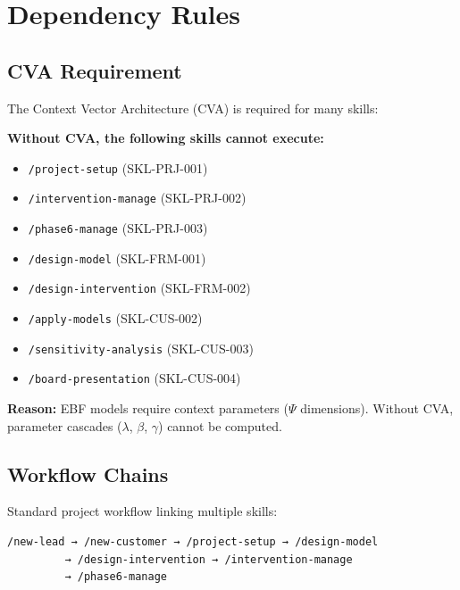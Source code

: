 
\section{Dependency Rules}
\label{sec:sk-dependencies}

\subsection{CVA Requirement}

The Context Vector Architecture (CVA) is required for many skills:

\begin{tcolorbox}[colback=red!5!white, colframe=red!75!black,
    title=CVA Required Skills]

\textbf{Without CVA, the following skills cannot execute:}
\begin{itemize}[nosep]
\item \texttt{/project-setup} (SKL-PRJ-001)
\item \texttt{/intervention-manage} (SKL-PRJ-002)
\item \texttt{/phase6-manage} (SKL-PRJ-003)
\item \texttt{/design-model} (SKL-FRM-001)
\item \texttt{/design-intervention} (SKL-FRM-002)
\item \texttt{/apply-models} (SKL-CUS-002)
\item \texttt{/sensitivity-analysis} (SKL-CUS-003)
\item \texttt{/board-presentation} (SKL-CUS-004)
\end{itemize}

\textbf{Reason:} EBF models require context parameters ($\Psi$ dimensions).
Without CVA, parameter cascades ($\lambda$, $\beta$, $\gamma$) cannot be computed.

\end{tcolorbox}

\subsection{Workflow Chains}

Standard project workflow linking multiple skills:

\begin{verbatim}
/new-lead → /new-customer → /project-setup → /design-model
         → /design-intervention → /intervention-manage
         → /phase6-manage
\end{verbatim}

